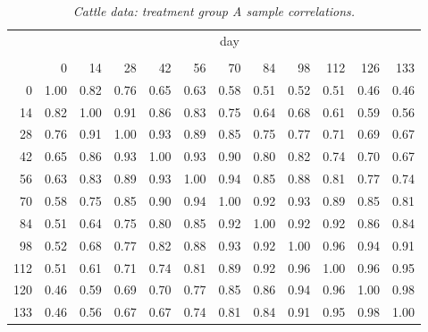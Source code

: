 \begin{table}[H] 
\begin{center}
\begin{tabular}{r|rrrrrrrrrrr}
& \multicolumn{11}{c}{day}\\
&&&&&&&&&&\\
& 0 & 14 & 28 & 42 & 56 & 70 & 84 & 98& 112& 126 &133\\
  \hline\noalign{\smallskip} 
0 & 1.00 & 0.82 & 0.76 & 0.65 & 0.63 & 0.58 & 0.51 & 0.52 & 0.51 & 0.46 & 0.46 \\ 
  14 & 0.82 & 1.00 & 0.91 & 0.86 & 0.83 & 0.75 & 0.64 & 0.68 & 0.61 & 0.59 & 0.56 \\ 
  28 & 0.76 & 0.91 & 1.00 & 0.93 & 0.89 & 0.85 & 0.75 & 0.77 & 0.71 & 0.69 & 0.67 \\ 
  42 & 0.65 & 0.86 & 0.93 & 1.00 & 0.93 & 0.90 & 0.80 & 0.82 & 0.74 & 0.70 & 0.67 \\ 
  56 & 0.63 & 0.83 & 0.89 & 0.93 & 1.00 & 0.94 & 0.85 & 0.88 & 0.81 & 0.77 & 0.74 \\ 
  70 & 0.58 & 0.75 & 0.85 & 0.90 & 0.94 & 1.00 & 0.92 & 0.93 & 0.89 & 0.85 & 0.81 \\ 
  84 & 0.51 & 0.64 & 0.75 & 0.80 & 0.85 & 0.92 & 1.00 & 0.92 & 0.92 & 0.86 & 0.84 \\ 
  98 & 0.52 & 0.68 & 0.77 & 0.82 & 0.88 & 0.93 & 0.92 & 1.00 & 0.96 & 0.94 & 0.91 \\ 
  112 & 0.51 & 0.61 & 0.71 & 0.74 & 0.81 & 0.89 & 0.92 & 0.96 & 1.00 & 0.96 & 0.95 \\ 
  120 & 0.46 & 0.59 & 0.69 & 0.70 & 0.77 & 0.85 & 0.86 & 0.94 & 0.96 & 1.00 & 0.98 \\ 
  133 & 0.46 & 0.56 & 0.67 & 0.67 & 0.74 & 0.81 & 0.84 & 0.91 & 0.95 & 0.98 & 1.00 \\ 
   \hline
\end{tabular}
\caption{\textit{Cattle data: treatment group A sample correlations.}}\label{table:cattleA-sample-correlations}
\end{center}
\end{table}


